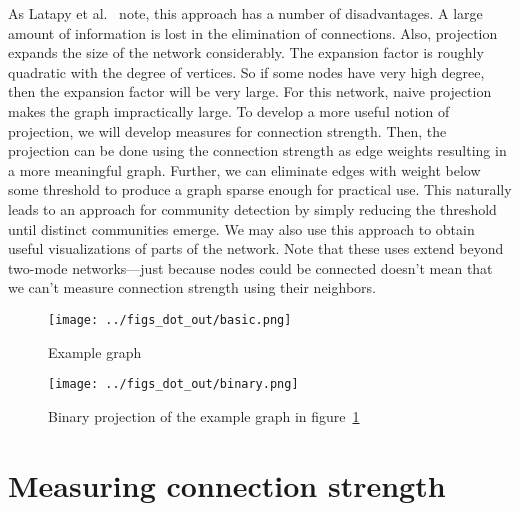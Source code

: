 \documentclass{pset}
\begin{document}
As Latapy et al.~\cite{latapy} note, this approach has a number of
disadvantages. A large amount of information is lost in the elimination of
connections. Also, projection expands the size of the network considerably. The
expansion factor is roughly quadratic with the degree of vertices. So if some
nodes have very high degree, then the expansion factor will
be very large.  For this network, naive projection makes the graph
impractically large. To develop a more useful notion of projection, we will
develop measures for connection strength.  Then, the projection can be done
using the connection strength as edge weights resulting in a more meaningful
graph. Further, we can eliminate edges with weight below some threshold to
produce a graph sparse enough for practical use. This naturally leads to an
approach for community detection by simply reducing the threshold until
distinct communities emerge. We may also use this approach to obtain useful
visualizations of parts of the network. Note that these uses extend beyond
two-mode networks---just because nodes could be connected doesn't mean that we
can't measure connection strength using their neighbors.

\begin{figure}[ht]
\centering
\texttt{[image: ../figs\_dot\_out/basic.png]}
\caption{Example graph}\label{fig:example}
\end{figure}

\begin{figure}[ht]
\centering
\texttt{[image: ../figs\_dot\_out/binary.png]}
\caption{Binary projection of the example graph in figure~\ref{fig:example}}\label{fig:binary}
\end{figure}

\section*{Measuring connection strength}
\end{document}
